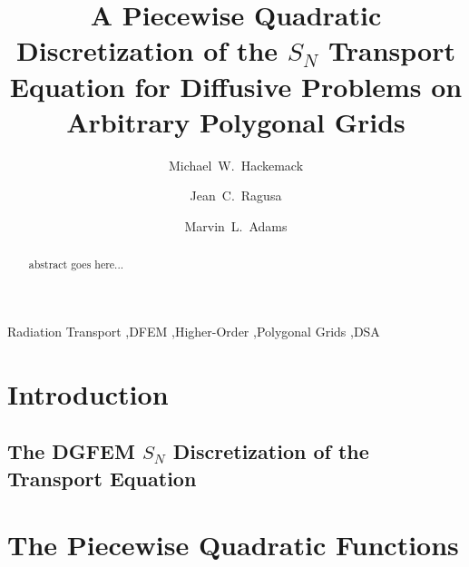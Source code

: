 \documentclass[preprint,review,10pt]{elsarticle}
\begin{document}
\begin{frontmatter}
\title{A Piecewise Quadratic Discretization of the $S_N$ Transport Equation for Diffusive Problems on Arbitrary Polygonal Grids}
\author[kapl]{Michael~W.~Hackemack}
\author[tamu]{Jean~C.~Ragusa}
\author[tamu]{Marvin~L.~Adams}
\address[kapl]{Knolls Atomic Power Laboratory, P.O. Box 1072, Schenectady, NY 12301, USA}
\address[tamu]{Department of Nuclear Engineering, Texas A\&M University, College Station, TX 77843, USA}
\begin{abstract}
abstract goes here...
\end{abstract}
\begin{keyword}
Radiation Transport \sep DFEM \sep Higher-Order \sep Polygonal Grids \sep DSA 
\end{keyword}
\end{frontmatter}

\linenumbers

\section{Introduction} \label{sec::intro}


\subsection{The DGFEM $S_N$ Discretization of the Transport Equation} \label{sec::intro_trans}



\section{The Piecewise Quadratic Functions} \label{sec::PWQ}
\end{document}
